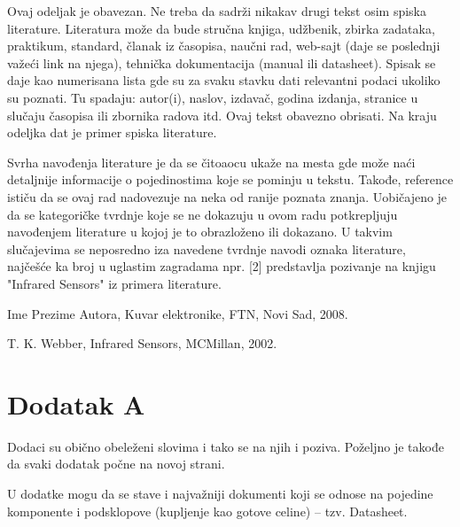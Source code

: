 \documentclass[a4paper, 12pt]{article}
\begin{document}
\vspace{10pt}


Ovaj odeljak je obavezan. Ne treba da sadrži nikakav drugi tekst osim spiska literature. Literatura može da bude stručna knjiga, udžbenik, zbirka zadataka, praktikum, standard, članak iz časopisa, naučni rad, web-sajt (daje se poslednji važeći link na njega), tehnička dokumentacija (manual ili datasheet). Spisak se daje kao numerisana lista gde su za svaku stavku dati relevantni podaci ukoliko su poznati. Tu spadaju: autor(i), naslov, izdavač, godina izdanja, stranice u slučaju časopisa ili zbornika radova itd. Ovaj tekst obavezno obrisati. Na kraju odeljka dat je primer spiska literature.

\vspace{10pt}

Svrha navođenja literature je da se čitoaocu ukaže na mesta gde može naći detaljnije informacije o pojedinostima koje se pominju u tekstu. Takođe, reference ističu da se ovaj rad nadovezuje na neka od ranije poznata znanja. Uobičajeno je da se kategoričke tvrdnje koje se ne dokazuju u ovom radu potkrepljuju navođenjem literature u kojoj je to obrazloženo ili dokazano. U takvim slučajevima se neposredno iza navedene tvrdnje navodi oznaka literature, najčešće ka broj u uglastim zagradama npr. [2] predstavlja pozivanje na knjigu "Infrared Sensors" iz primera literature.


\begin{enumerate}[label={[1]},leftmargin=2.5cm]
	\item Ime Prezime Autora, Kuvar elektronike, FTN, Novi Sad, 2008.
	\item T. K. Webber, Infrared Sensors, MCMillan, 2002.
\end{enumerate}
\pagebreak

\section*{Dodatak A}

\vspace{10pt}


Dodaci su obično obeleženi slovima i tako se na njih i poziva. Poželjno je takođe da svaki dodatak počne na novoj strani.

\vspace{10pt}

U dodatke mogu da se stave i najvažniji dokumenti koji se odnose na pojedine komponente i podsklopove (kupljenje kao gotove celine) – tzv. Datasheet. 
\end{document}
